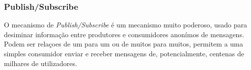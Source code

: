 \subsubsection{Publish/Subscribe}
O mecanismo  de \textit{Publish/Subscribe} é um mecanismo muito poderoso, usado para desiminar informação entre produtores e consumidores anonímos de mensagens. Podem ser relaçoes de um para um ou de muitos para muitos, permitem a uma simples consumidor enviar e receber mensagens de, potencialmente, centenas de milhares de utilizadores. \\



